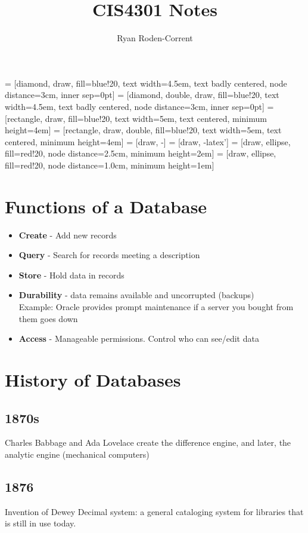 \documentclass{article}
\title{CIS4301 Notes}
\author{Ryan Roden-Corrent}
\date{}
\begin{document}
\setlength\parindent{0pt}
 = [diamond, draw, fill=blue!20, text width=4.5em,
  text badly centered, node distance=3cm, inner sep=0pt]
 = [diamond, double, draw, fill=blue!20, text width=4.5em,
  text badly centered, node distance=3cm, inner sep=0pt]
 = [rectangle, draw, fill=blue!20, text width=5em,
  text centered, minimum height=4em]
 = [rectangle, draw, double, fill=blue!20, text width=5em,
  text centered, minimum height=4em]
 = [draw, -]
 = [draw, -latex']
 = [draw, ellipse, fill=red!20, node distance=2.5cm,
  minimum height=2em]
 = [draw, ellipse, fill=red!20, node distance=1.0cm,
  minimum height=1em]
\maketitle

\section{Functions of a Database}
\begin{itemize}
    \item \textbf{Create} - Add new records
    \item \textbf{Query} - Search for records meeting a description
    \item \textbf{Store} - Hold data in records
    \item \textbf{Durability} - data remains available and uncorrupted (backups)\\
        Example: Oracle provides prompt maintenance if a server you bought from
        them goes down
    \item \textbf{Access} - Manageable permissions. Control who can see/edit
        data
\end{itemize}

\section{History of Databases}
\subsection*{1870s}
Charles Babbage and Ada Lovelace create the difference engine, and later, the
analytic engine (mechanical computers)
\subsection*{1876}
Invention of Dewey Decimal system: a general cataloging system for libraries
that is still in use today.
\end{document}
